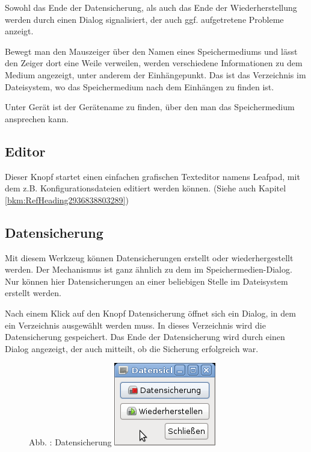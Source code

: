 \documentclass[a4paper,12pt,twoside]{article}
\newcounter{Abb}
\renewcommand\theAbb{\arabic{Abb}}
\begin{document}
Sowohl das Ende der Datensicherung, als auch das Ende der
Wiederherstellung werden durch einen Dialog signalisiert, der auch ggf.
aufgetretene Probleme anzeigt.


\bigskip

Bewegt man den Mauszeiger über den Namen eines Speichermediums und lässt
den Zeiger dort eine Weile verweilen, werden verschiedene Informationen
zu dem Medium angezeigt, unter anderem der Einhängepunkt. Das ist das
Verzeichnis im Dateisystem, wo das Speichermedium nach dem Einhängen zu
finden ist.

Unter Gerät ist der Gerätename zu finden, über den man das
Speichermedium ansprechen kann.


\bigskip

\subsection[Editor]{Editor}
\label{bkm:RefHeading30771485014445}Dieser Knopf startet einen einfachen
grafischen Texteditor namens {\textquotedbl}Leafpad{\textquotedbl}, mit
dem z.B. Konfigurationsdateien editiert werden können. (Siehe auch
Kapitel \ref{bkm:RefHeading2936838803289})


\bigskip

\subsection[Datensicherung]{Datensicherung}
\label{bkm:RefHeading138841045300}Mit diesem Werkzeug können
Datensicherungen erstellt oder wiederhergestellt werden. Der
Mechanismus ist ganz ähnlich zu dem im Speichermedien-Dialog. Nur
können hier Datensicherungen an einer beliebigen Stelle im Dateisystem
erstellt werden.

Nach einem Klick auf den Knopf
{\textquotedbl}Datensicherung{\textquotedbl} öffnet sich ein Dialog, in
dem ein Verzeichnis ausgewählt werden muss. In dieses Verzeichnis wird
die Datensicherung gespeichert. Das Ende der Datensicherung wird durch
einen Dialog angezeigt, der auch mitteilt, ob die Sicherung erfolgreich
war.


\bigskip



\begin{figure}
\centering
\begin{minipage}{5.689cm}
Abb. \stepcounter{Abb}{\theAbb}: Datensicherung
\includegraphics[width=4.445cm,height=3.625cm]{efaLivede-img/efaLivede-img21.png}\end{minipage}
\end{figure}
\end{document}
